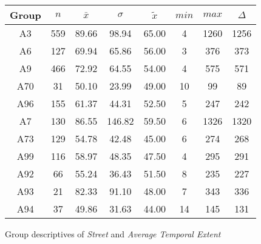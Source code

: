 \begin{figure}[ht!]
	\centering
	\begin{minipage}{0.5\textwidth}
		\tiny
		\setlength{\tabcolsep}{4pt}
		\centering
		\begin{tabular}{c|c|c|c|c|c|c|c}
			\toprule
			Group & $n$ & $\bar{x}$ & $\sigma$ & $\tilde{x}$ & $min$ & $max$ & $\Delta$ \\
			\midrule
			A3  & 559 & 89.66 & 98.94  & 65.00 & 4  & 1260 & 1256 \\ 
			A6  & 127 & 69.94 & 65.86  & 56.00 & 3  & 376  & 373  \\ 
			A9  & 466 & 72.92 & 64.55  & 54.00 & 4  & 575  & 571  \\ 
			A70 & 31  & 50.10 & 23.99  & 49.00 & 10 & 99   & 89   \\ 
			A96 & 155 & 61.37 & 44.31  & 52.50 & 5  & 247  & 242  \\ 
			A7  & 130 & 86.55 & 146.82 & 59.50 & 6  & 1326 & 1320 \\ 
			A73 & 129 & 54.78 & 42.48  & 45.00 & 6  & 274  & 268  \\ 
			A99 & 116 & 58.97 & 48.35  & 47.50 & 4  & 295  & 291  \\ 
			A92 & 66  & 55.24 & 36.43  & 51.50 & 8  & 235  & 227  \\ 
			A93 & 21  & 82.33 & 91.10  & 48.00 & 7  & 343  & 336  \\ 
			A94 & 37  & 49.86 & 31.63  & 44.00 & 14 & 145  & 131  \\ 
			\bottomrule
		\end{tabular}
		\label{tbl:descriptives_baysis_matched_Str_TAvg}
	\end{minipage}%
	\begin{minipage}{0.55\textwidth}
		\tiny
		\centering
		\vfill
		\label{fig:descriptives_baysis_matched_Str_TAvg}
	\end{minipage}%
	\caption{Group descriptives of \textit{Street} and \textit{Average Temporal Extent}}
\end{figure}
